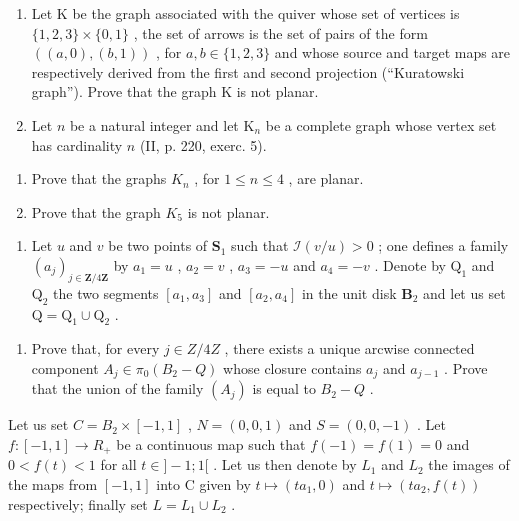 \begin{enumerate}
\def\labelenumi{\arabic{enumi})}
\setcounter{enumi}{20}
\item
  Let K be the graph associated with the quiver whose set of vertices is \(\{1,2,3\} \times \{0,1\}\) , the set of arrows is the set of pairs of the form \(((a,0),(b,1))\) , for \(a,b\in \{1,2,3\}\) and whose source and target maps are respectively derived from the first and second projection (“Kuratowski graph”). Prove that the graph K is not planar.
\item
  Let \(n\) be a natural integer and let \(\mathrm{K}_n\) be a complete graph whose vertex set has cardinality \(n\) (II, p. 220, exerc. 5).
\end{enumerate}

\begin{enumerate}
\def\labelenumi{\alph{enumi})}
\item
  Prove that the graphs \(K_{n}\) , for \(1 \leqslant n \leqslant 4\) , are planar.
\item
  Prove that the graph \(K_{5}\) is not planar.
\end{enumerate}

\begin{enumerate}
\def\labelenumi{\arabic{enumi})}
\setcounter{enumi}{22}
\tightlist
\item
  Let \(u\) and \(v\) be two points of \(\mathbf{S}_1\) such that \(\mathcal{I}(v / u) > 0\) ; one defines a family \((a_j)_{j \in \mathbf{Z} / 4\mathbf{Z}}\) by \(a_1 = u\) , \(a_2 = v\) , \(a_3 = -u\) and \(a_4 = -v\) . Denote by \(\mathrm{Q}_1\) and \(\mathrm{Q}_2\) the two segments \([a_1, a_3]\) and \([a_2, a_4]\) in the unit disk \(\mathbf{B}_2\) and let us set \(\mathrm{Q} = \mathrm{Q}_1 \cup \mathrm{Q}_2\) .
\end{enumerate}

\begin{enumerate}
\def\labelenumi{\alph{enumi})}
\tightlist
\item
  Prove that, for every \(j \in Z/4Z\) , there exists a unique arcwise connected component \(A_{j} \in \pi_{0}(B_{2}-Q)\) whose closure contains \(a_{j}\) and \(a_{j-1}\) . Prove that the union of the family \((A_{j})\) is equal to \(B_{2}-Q\) .
\end{enumerate}

 Let us set \(C = B_{2} \times [-1, 1]\) , \(N = (0, 0, 1)\) and \(S = (0, 0, -1)\) . Let \(f: [-1, 1] \to R_{+}\) be a continuous map such that \(f(-1) = f(1) = 0\) and \(0 < f(t) < 1\) for all \(t \in ]-1; 1[\) . Let us then denote by \(L_{1}\) and \(L_{2}\) the images of the maps from \([-1, 1]\) into C given by \(t \mapsto (ta_{1}, 0)\) and \(t \mapsto (ta_{2}, f(t))\) respectively; finally set \(L = L_{1} \cup L_{2}\) .

